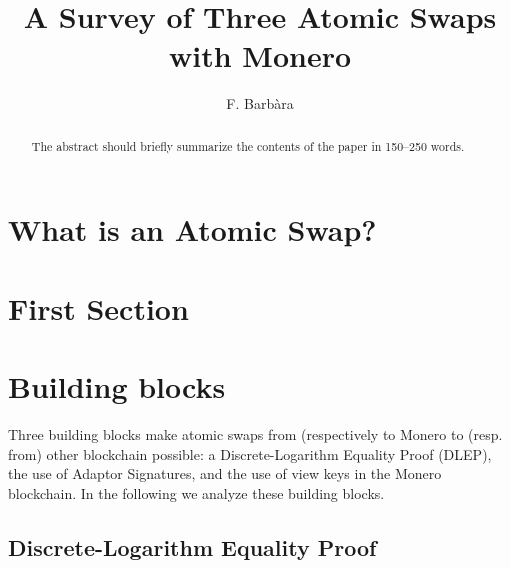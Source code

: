 \documentclass[runningheads]{llncs}
\begin{document}
%
\title{A Survey of Three Atomic Swaps with Monero}
%
%
\author{F. Barb\`ara}
%
%
%
\maketitle              %
%
\begin{abstract}
The abstract should briefly summarize the contents of the paper in
150--250 words.

\end{abstract}
%
%
%
\section{What is an Atomic Swap?}
\section{First Section}
\section{Building blocks}
Three building blocks make atomic swaps from (respectively to Monero to (resp. from) other blockchain possible: a Discrete-Logarithm Equality Proof (DLEP), the use of Adaptor Signatures, and the use of view keys in the Monero blockchain.
In the following we analyze these building blocks.

\subsection{Discrete-Logarithm Equality Proof}\label{sec:dlep}
\end{document}
